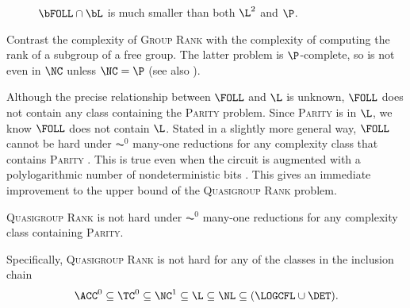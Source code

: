 \documentclass{article}
\begin{document}
\begin{figure}
  \caption{\label{fig:inclusions}$\bFOLL \cap \bL$ is much smaller than both $\L^2$ and $\P$.}
  \begin{center}
  \end{center}
\end{figure}


Contrast the complexity of \textsc{Group Rank} with the complexity of computing the rank of a subgroup of a free group.
The latter problem is $\P$-complete, so is not even in $\NC$ unless $\NC = \P$ \autocite[Theorem~4.9]{am84} (see also \autocite[Problem~A.8.11]{ghr95}).

Although the precise relationship between $\FOLL$ and $\L$ is unknown, $\FOLL$ does not contain any class containing the \textsc{Parity} problem.
Since \textsc{Parity} is in $\L$, we know $\FOLL$ does not contain $\L$.
Stated in a slightly more general way, $\FOLL$ cannot be hard under $\AC^0$ many-one reductions for any complexity class that contains \textsc{Parity} \cite[Proposition~2.1]{bklm01}.
This is true even when the circuit is augmented with a polylogarithmic number of nondeterministic bits \cite[Section~4]{ctw13}.
This gives an immediate improvement to the upper bound of the \textsc{Quasigroup Rank} problem.

\begin{theorem}
  \textsc{Quasigroup Rank} is not hard under $\AC^0$ many-one reductions for any complexity class containing \textsc{Parity}.
\end{theorem}

Specifically, \textsc{Quasigroup Rank} is not hard for any of the classes in the inclusion chain
\begin{equation*}
  \ACC^0 \subseteq \TC^0 \subseteq \NC^1 \subseteq \L \subseteq \NL \subseteq (\LOGCFL \cup \DET).
\end{equation*}

\printbibliography
\end{document}
